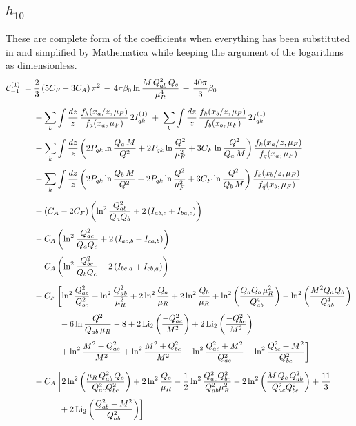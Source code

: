 \subsection{$h_{10}$}
These are complete form of the coefficients when everything has been substituted in and simplified by 
Mathematica while keeping the argument of the logarithms as dimensionless. 
\begin{equation}
\begin{aligned}
\mathcal{C}^{(1)}_{-1} \;=\;& \frac{2}{3}\left(5C_F-3C_A\right)\pi^2 \,-\,4\pi\beta_0\ln\frac{M\,Q_{ab}^2\,Q_c}{\mu_R^4}\,+\,\frac{40\pi}{3}\beta_0 \\[1.5ex]
&+\sum_{k}\int\frac{dz}{z}\,\frac{f_k(x_a/z,\mu_F)}{f_a(x_a,\mu_F)}\,2I_{qk}^{(1)}
 \;+\;\sum_{k}\int\frac{dz}{z}\,\frac{f_k(x_b/z,\mu_F)}{f_b(x_b,\mu_F)}\,2I_{\bar{q}k}^{(1)} \\[1ex]
&+\sum_{k}\int\frac{dz}{z}\left(2P_{qk}\ln\frac{Q_a\,M}{Q^2}+2P_{qk}\ln\frac{Q^2}{\mu_F^2}+3C_F\ln\frac{Q^2}{Q_a\,M}\right)\frac{f_k(x_a/z,\mu_F)}{f_q(x_a,\mu_F)} \\[1ex]
&+\sum_{k}\int\frac{dz}{z}\left(2P_{\bar{q}k}\ln\frac{Q_b\,M}{Q^2}+2P_{\bar{q}k}\ln\frac{Q^2}{\mu_F^2}+3C_F\ln\frac{Q^2}{Q_b\,M}\right)\frac{f_k(x_b/z,\mu_F)}{f_{\bar q}(x_b,\mu_F)} \\[1.5ex]
&+(C_A-2C_F)\left(\ln^2\frac{Q_{ab}^2}{Q_aQ_b}+2\left(I_{ab,c}+I_{ba,c}\right)\right) \\[1ex]
&-C_A\left(\ln^2\frac{Q_{ac}^2}{Q_aQ_c}+2\left(I_{ac,b}+I_{ca,b}\right)\right) \\[1ex]
&-C_A\left(\ln^2\frac{Q_{bc}^2}{Q_bQ_c}+2\left(I_{bc,a}+I_{cb,a}\right)\right) \\[1.5ex]
&+C_F\left[\ln^2\frac{Q_{ac}^2}{Q_{bc}^2}-\ln^2\frac{Q_{ab}^2}{\mu_R^2}
 +2\ln^2\frac{Q_a}{\mu_R}+2\ln^2\frac{Q_b}{\mu_R}
 +\ln^2\left(\frac{Q_aQ_b\,\mu_R^2}{Q_{ab}^4}\right)
 -\ln^2\left(\frac{M^2Q_aQ_b}{Q_{ab}^4}\right) \right.\\[1ex]
&\left.\hphantom{+C_F\left[\right.}
 -6\ln\frac{Q^2}{Q_{ab}\,\mu_R}-8
 +2\operatorname{Li}_2\left(\frac{-Q_{ac}^2}{M^2}\right)+2\operatorname{Li}_2\left(\frac{-Q_{bc}^2}{M^2}\right) \right.\\[1ex]
&\left.\hphantom{+C_F\left[\right.}
 +\ln^2\frac{M^2+Q_{ac}^2}{M^2}+\ln^2\frac{M^2+Q_{bc}^2}{M^2}
 -\ln^2\frac{Q_{ac}^2+M^2}{Q_{ac}^2}-\ln^2\frac{Q_{bc}^2+M^2}{Q_{bc}^2}\right] \\[1.5ex]
&+C_A\left[2\ln^2\left(\frac{\mu_R\,Q_{ab}^2\,Q_c}{Q_{ac}^2Q_{bc}^2}\right)+2\ln^2\frac{Q_c}{\mu_R}
 -\frac{1}{2}\ln^2\frac{Q_{ac}^2Q_{bc}^2}{Q_{ab}^2\mu_R^2}
 -2\ln^2\left(\frac{M\,Q_c\,Q_{ab}^2}{Q_{ac}^2Q_{bc}^2}\right)+\frac{11}{3} \right.\\[1ex]
&\left.\hphantom{+C_A\left[\right.}
 +2\operatorname{Li}_2\left(\frac{Q_{ab}^2-M^2}{Q_{ab}^2}\right)\right]
\end{aligned}
\end{equation}

